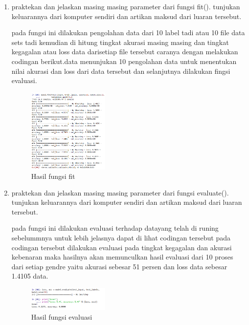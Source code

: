 \begin{enumerate}
\begin{figure}[H]
          \end{figure}
    
    \item praktekan dan jelaskan masing masing parameter dari fungsi fit().  tunjukan keluarannya dari komputer sendiri dan artikan maksud dari luaran tersebut.\par
    \subitem pada fungsi ini dilakukan pengolahan data dari 10 label tadi atau 10 file data sets tadi kemudian di hitung tingkat akurasi masing masing dan tingkat kegagalan atau loss data darisetiap file tersebut caranya dengan melakukan codingan berikut.data menunjukan 10 pengolahan data untuk menentukan nilai akurasi dan loss dari data tersebut dan selanjutnya dilakukan fingsi evaluasi.
    
    
    
    \begin{figure}[H]
          \centering
          \includegraphics[width=4cm]
          {figures/1174035/chapter6/praktek_7.png}
          \caption{Hasil fungsi fit}
          
          \end{figure}
    
    \item praktekan dan jelaskan masing masing parameter dari fungsi evaluate().  tunjukan keluarannya dari komputer sendiri dan artikan maksud dari luaran tersebut.\par
    \subitem pada fungsi ini dilakukan evaluasi terhadap datayang telah di runing sebelummnya untuk lebih jelasnya dapat di lihat codingan tersebut  pada codingan tersebut dilakukan evaluasi pada tingkat kegagalan dan akurasi kebenaran maka hasilnya akan memunculkan hasil evaluasi dari 10 proses dari setiap gendre yaitu akurasi sebesar 51 persen dan loss data sebesar 1.4105 data.
    
    
    
    \begin{figure}[H]
          \centering
          \includegraphics[width=4cm]
          {figures/1174035/chapter6/praktek_8.png}
          \caption{Hasil fungsi evaluasi}
          

\end{figure}
\end{enumerate}
